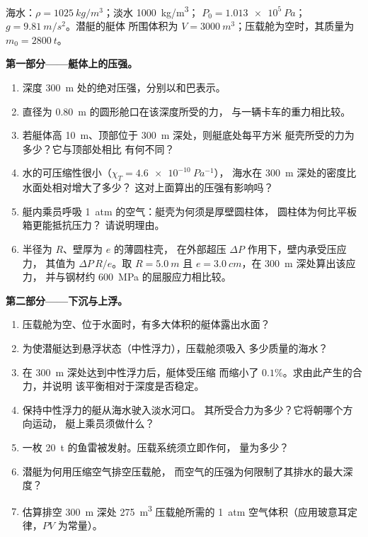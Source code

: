 \begin{problem}
\label{pb:b1:fluid-statics:1}
海水：$\rho = \qty{1025}{kg/m^3}$；淡水 \qty{1000}{kg/m^3}；
$P_0 = \qty{1.013e5}{Pa}$；$g = \qty{9.81}{m/s^2}$。潜艇的艇体
所围体积为 $V = \qty{3000}{m^3}$；压载舱为空时，其质量为
$m_0 = \qty{2800}{t}$。

\medskip
\noindent\textbf{第一部分——艇体上的压强。}
\begin{enumerate}
  \item 深度 \qty{300}{m} 处的绝对压强，分别以和巴表示。
  \item 直径为 \qty{0.80}{m} 的圆形舱口在该深度所受的力，
        与一辆卡车的重力相比较。
  \item 若艇体高 \qty{10}{m}、顶部位于 \qty{300}{m} 深处，则艇底处每平方米
        艇壳所受的力为多少？它与顶部处相比
        有何不同？
  \item 水的可压缩性很小（$\chi_T = \qty{4.6e-10}{Pa^{-1}}$），
        海水在 \qty{300}{m} 深处的密度比水面处相对增大了多少？
        这对上面算出的压强有影响吗？
  \item 艇内乘员呼吸 \qty{1}{atm} 的空气：艇壳为何须是厚壁圆柱体，
        圆柱体为何比平板箱更能抵抗压力？
        请说明理由。
  \item 半径为 $R$、壁厚为 $e$ 的薄圆柱壳，
        在外部超压 $\Delta P$ 作用下，壁内承受压应力，
        其值为 $\Delta P\,R/e$。取 $R = \qty{5.0}{m}$ 且
        $e = \qty{3.0}{cm}$，在 \qty{300}{m} 深处算出该应力，
        并与钢材约 \qty{600}{MPa} 的屈服应力相比较。
\end{enumerate}

\medskip
\noindent\textbf{第二部分——下沉与上浮。}
\begin{enumerate}[resume]
  \item 压载舱为空、位于水面时，有多大体积的艇体露出水面？
  \item 为使潜艇达到悬浮状态（中性浮力），压载舱须吸入
        多少质量的海水？
  \item 在 \qty{300}{m} 深处达到中性浮力后，艇体受压缩
        而缩小了 $0.1\%$。求由此产生的合力，并说明
        该平衡相对于深度是否稳定。
  \item 保持中性浮力的艇从海水驶入淡水河口。
        其所受合力为多少？它将朝哪个方向运动，
        艇上乘员须做什么？
  \item 一枚 \qty{20}{t} 的鱼雷被发射。压载系统须立即作何，
        量为多少？
  \item 潜艇为何用压缩空气排空压载舱，
        而空气的压强为何限制了其排水的最大深度？
  \item 估算排空 \qty{300}{m} 深处 \qty{275}{m^3} 压载舱所需的
        \qty{1}{atm} 空气体积（应用玻意耳定律，$PV$
        为常量）。
\end{enumerate}


\end{problem}
